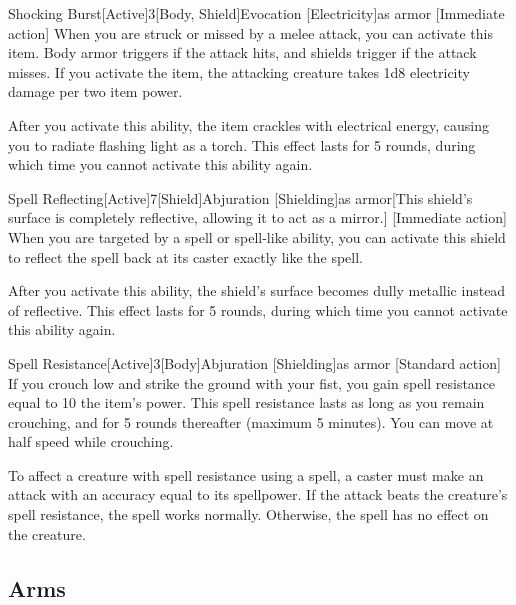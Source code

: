 \begin{magicitemdef}{Shocking Burst}[Active]{3}[Body, Shield]{Evocation [Electricity]}{as armor}
    [Immediate action] When you are struck or missed by a melee attack, you can activate this item.
    Body armor triggers if the attack hits, and shields trigger if the attack misses.
    If you activate the item, the attacking creature takes 1d8 electricity damage per two item power.

    After you activate this ability, the item crackles with electrical energy, causing you to radiate flashing light as a torch.
    This effect lasts for 5 rounds, during which time you cannot activate this ability again.
\end{magicitemdef}

\begin{magicitemdef}{Spell Reflecting}[Active]{7}[Shield]{Abjuration [Shielding]}{as armor}[This shield's surface is completely reflective, allowing it to act as a mirror.]
    [Immediate action] When you are targeted by a spell or spell-like ability, you can activate this shield to reflect the spell back at its caster exactly like the  spell.

    After you activate this ability, the shield's surface becomes dully metallic instead of reflective.
    This effect lasts for 5 rounds, during which time you cannot activate this ability again.
\end{magicitemdef}

\begin{magicitemdef}{Spell Resistance}[Active]{3}[Body]{Abjuration [Shielding]}{as armor}
    [Standard action] If you crouch low and strike the ground with your fist, you gain spell resistance equal to 10 \add the item's power.
    This spell resistance lasts as long as you remain crouching, and for 5 rounds thereafter (maximum 5 minutes).
    You can move at half speed while crouching.

    To affect a creature with spell resistance using a spell, a caster must make an attack with an accuracy equal to its spellpower.
    If the attack beats the creature's spell resistance, the spell works normally.
    Otherwise, the spell has no effect on the creature.
\end{magicitemdef}

\subsection{Arms}

